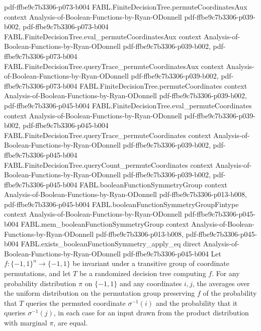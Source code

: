 \begin{theorem}
{    pdf-ffbe9c7b3306-p073-b004}
\proofstep
  {FABL.FiniteDecisionTree.permuteCoordinatesAux}
  {context}
  {Analysis-of-Boolean-Functions-by-Ryan-ODonnell}
  {pdf-ffbe9c7b3306-p039-b002,
    pdf-ffbe9c7b3306-p073-b004}
\proofstep
  {FABL.FiniteDecisionTree.eval_permuteCoordinatesAux}
  {context}
  {Analysis-of-Boolean-Functions-by-Ryan-ODonnell}
  {pdf-ffbe9c7b3306-p039-b002,
    pdf-ffbe9c7b3306-p073-b004}
\proofstep
  {FABL.FiniteDecisionTree.queryTrace_permuteCoordinatesAux}
  {context}
  {Analysis-of-Boolean-Functions-by-Ryan-ODonnell}
  {pdf-ffbe9c7b3306-p039-b002,
    pdf-ffbe9c7b3306-p073-b004}
\proofstep
  {FABL.FiniteDecisionTree.permuteCoordinates}
  {context}
  {Analysis-of-Boolean-Functions-by-Ryan-ODonnell}
  {pdf-ffbe9c7b3306-p039-b002,
    pdf-ffbe9c7b3306-p045-b004}
\proofstep
  {FABL.FiniteDecisionTree.eval_permuteCoordinates}
  {context}
  {Analysis-of-Boolean-Functions-by-Ryan-ODonnell}
  {pdf-ffbe9c7b3306-p039-b002,
    pdf-ffbe9c7b3306-p045-b004}
\proofstep
  {FABL.FiniteDecisionTree.queryTrace_permuteCoordinates}
  {context}
  {Analysis-of-Boolean-Functions-by-Ryan-ODonnell}
  {pdf-ffbe9c7b3306-p039-b002,
    pdf-ffbe9c7b3306-p045-b004}
\proofstep
  {FABL.FiniteDecisionTree.queryCount_permuteCoordinates}
  {context}
  {Analysis-of-Boolean-Functions-by-Ryan-ODonnell}
  {pdf-ffbe9c7b3306-p039-b002,
    pdf-ffbe9c7b3306-p045-b004}
\proofstep
  {FABL.booleanFunctionSymmetryGroup}
  {context}
  {Analysis-of-Boolean-Functions-by-Ryan-ODonnell}
  {pdf-ffbe9c7b3306-p013-b008,
    pdf-ffbe9c7b3306-p045-b004}
\proofstep
  {FABL.booleanFunctionSymmetryGroupFintype}
  {context}
  {Analysis-of-Boolean-Functions-by-Ryan-ODonnell}
  {pdf-ffbe9c7b3306-p045-b004}
\proofstep
  {FABL.mem_booleanFunctionSymmetryGroup}
  {context}
  {Analysis-of-Boolean-Functions-by-Ryan-ODonnell}
  {pdf-ffbe9c7b3306-p013-b008,
    pdf-ffbe9c7b3306-p045-b004}
\proofstep
  {FABL.exists_booleanFunctionSymmetry_apply_eq}
  {direct}
  {Analysis-of-Boolean-Functions-by-Ryan-ODonnell}
  {pdf-ffbe9c7b3306-p045-b004}
Let $f:\{-1,1\}^n\to\{-1,1\}$ be invariant under a transitive group of coordinate
permutations, and let $T$ be a randomized decision tree computing $f$. For any
probability distribution $\pi$ on $\{-1,1\}$ and any coordinates $i,j$, the averages
over the uniform distribution on the permutation group preserving $f$ of the probability
that $T$ queries the permuted coordinate $\sigma^{-1}(i)$ and the probability that it
queries $\sigma^{-1}(j)$, in each case for an input drawn from the product distribution
with marginal $\pi$, are equal.
\end{theorem}

